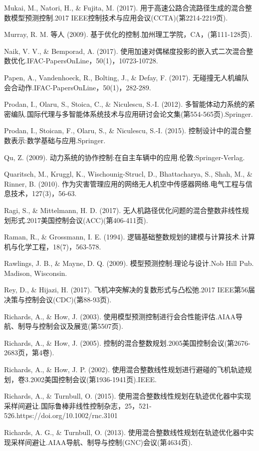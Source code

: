 \documentclass[10pt]{article}
\begin{document}
Mukai, M., Natori, H., \& Fujita, M. (2017). 用于高速公路合流路径生成的混合整数模型预测控制.2017 IEEE控制技术与应用会议(CCTA)(第2214-2219页).

Murray, R. M. 等人 (2009). 基于优化的控制.加州理工学院，CA，(第111-128页).

Naik, V. V., \& Bemporad, A. (2017). 使用加速对偶梯度投影的嵌入式二次混合整数优化.IFAC-PapersOnLine，50(1)，10723-10728.

Papen, A., Vandenhoeck, R., Bolting, J., \& Defay, F. (2017). 无碰撞无人机编队会合动作.IFAC-PapersOnLine，50(1)，282-289.

Prodan, I., Olaru, S., Stoica, C., \& Niculescu, S.-I. (2012). 多智能体动力系统的紧密编队.国际代理与多智能体系统技术与应用研讨会论文集(第554-565页).Springer.

Prodan, I., Stoican, F., Olaru, S., \& Niculescu, S.-I. (2015). 控制设计中的混合整数表示:数学基础与应用.Springer.

Qu, Z. (2009). 动力系统的协作控制:在自主车辆中的应用.伦敦:Springer-Verlag.

Quaritsch, M., Kruggl, K., Wischounig-Strucl, D., Bhattacharya, S., Shah, M., \& Rinner, B. (2010). 作为灾害管理应用的网络无人机空中传感器网络.电气工程与信息技术，127(3)，56-63.

Ragi, S., \& Mittelmann, H. D. (2017). 无人机路径优化问题的混合整数非线性规划形式.2017美国控制会议(ACC)(第406-411页).

Raman, R., \& Grossmann, I. E. (1994). 逻辑基础整数规划的建模与计算技术.计算机与化学工程，18(7)，563-578.

Rawlings, J. B., \& Mayne, D. Q. (2009). 模型预测控制:理论与设计.Nob Hill Pub. Madison, Wisconsin.

Rey, D., \& Hijazi, H. (2017). 飞机冲突解决的复数形式与凸松弛.2017 IEEE第56届决策与控制会议(CDC)(第88-93页).

Richards, A., \& How, J. (2003). 使用模型预测控制进行会合性能评估.AIAA导航、制导与控制会议及展览(第5507页).

Richards, A., \& How, J. (2005). 控制的混合整数规划.2005美国控制会议(第2676-2683页，第4卷).

Richards, A., \& How, J. P. (2002). 使用混合整数线性规划进行避碰的飞机轨迹规划，卷3.2002美国控制会议(第1936-1941页).IEEE.

Richards, A., \& Turnbull, O. (2015). 使用混合整数线性规划在轨迹优化器中实现采样间避让.国际鲁棒非线性控制杂志，25，521-526.https://doi.org/10.1002/rnc.3101

Richards, A. G., \& Turnbull, O. (2013). 使用混合整数线性规划在轨迹优化器中实现采样间避让.AIAA导航、制导与控制(GNC)会议(第4634页).
\end{document}
